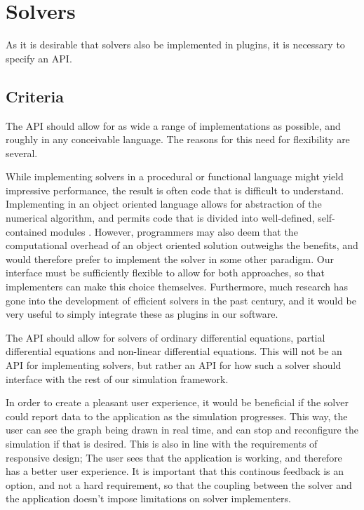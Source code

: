 \documentclass[\rootfolder/main.tex]{subfiles}
\begin{document}
\section{Solvers}


As it is desirable that solvers also be implemented in plugins, it is necessary to specify an API.

\subsection{Criteria}

The API should allow for as wide a range of implementations as possible, and roughly in any conceivable language.
The reasons for this need for flexibility are several.

While implementing solvers in a procedural or functional language might yield impressive performance, the result is often code that is difficult to understand.
Implementing in an object oriented language allows for abstraction of the numerical algorithm, and permits code that is divided into well-defined, self-contained modules \cite{kees1999}.
However, programmers may also deem that the computational overhead of an object oriented solution outweighs the benefits, and would therefore prefer to implement the solver in some other paradigm.
Our interface must be sufficiently flexible to allow for both approaches, so that implementers can make this choice themselves.
Furthermore, much research has gone into the development of efficient solvers in the past century, and it would be very useful to simply integrate these as plugins in our software.

The API should allow for solvers of ordinary differential equations, partial differential equations and non-linear differential equations.
This will not be an API for implementing solvers, but rather an API for how such a solver should interface with the rest of our simulation framework.

In order to create a pleasant user experience, it would be beneficial if the solver could report data to the application as the simulation progresses.
This way, the user can see the graph being drawn in real time, and can stop and reconfigure the simulation if that is desired.
This is also in line with the requirements of responsive design; The user sees that the application is working, and therefore has a better user experience.
It is important that this continous feedback is an option, and not a hard requirement, so that the coupling between the solver and the application doesn't impose limitations on solver implementers.
\end{document}
